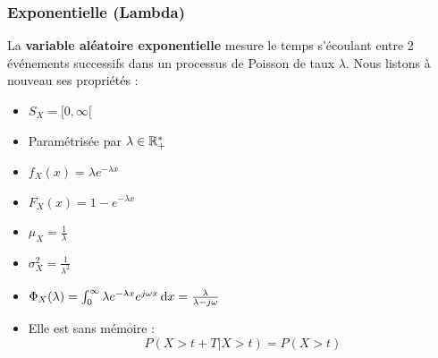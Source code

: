 \documentclass[11pt,a4paper]{article}
\numberwithin{equation}{section}
\begin{document}
\subsubsection{Exponentielle (Lambda)}
La \textbf{variable aléatoire exponentielle} mesure le temps s'écoulant entre 2 événements successifs dans un processus de Poisson de taux $\lambda$. Nous listons à nouveau ses propriétés :
\begin{multicols}{2}
    \begin{itemize}
        \item $S_X = [0,\infty[$
        \item Paramétrisée par $\lambda \in \mathbb{R}_+^*$
        \item $f_X(x) = \lambda e^{-\lambda x}$
        \item $F_X(x) = 1-e^{-\lambda x}$
        \item $\mu_X = \frac{1}{\lambda}$
        \item $\sigma_X^2 = \frac{1}{\lambda^2}$
        \item $\Phi_X(\lambda) = \int_0^\infty \lambda e^{-\lambda x} e^{j\omega x} \, \mathrm d x = \frac{\lambda}{\lambda - j\omega}$
        \item Elle est sans mémoire : \[P(X > t+T | X>t) = P(X>t)\]
    \end{itemize}
\end{multicols}
\end{document}
